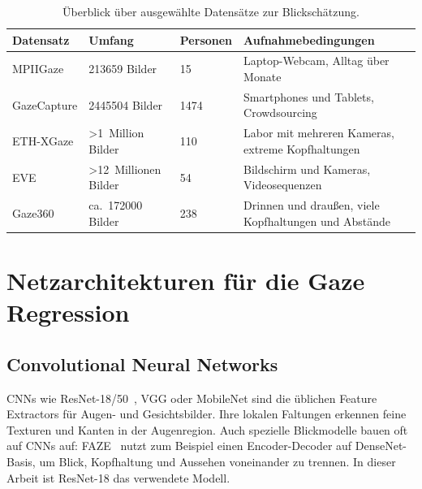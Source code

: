 \begin{table}[htbp]
  \centering
  \small
  \caption{Überblick über ausgewählte Datensätze zur Blickschätzung.}
  \label{tab:datensaetze}
  \begin{tabularx}{\textwidth}{L{2.4cm} L{2.6cm} L{2.2cm} Y}
    \toprule
    \textbf{Datensatz} & \textbf{Umfang} & \textbf{Personen} & \textbf{Aufnahmebedingungen} \\
    \midrule
    MPIIGaze      & \num{213659} Bilder & 15 & Laptop-Webcam, Alltag über Monate \\
    GazeCapture   & \num{2445504} Bilder & \num{1474} & Smartphones und Tablets, Crowdsourcing \\
    ETH-XGaze     & >1~Million Bilder & 110 & Labor mit mehreren Kameras, extreme Kopfhaltungen \\
    EVE           & >12~Millionen Bilder & 54 & Bildschirm und Kameras, Videosequenzen \\
    Gaze360       & ca.\ \num{172000} Bilder & 238 & Drinnen und draußen, viele Kopfhaltungen und Abstände \\
    \bottomrule
  \end{tabularx}
\end{table}

\section{Netzarchitekturen für die Gaze Regression}
\label{sec:architekturen}
\subsection{Convolutional Neural Networks}
\label{subsec:cnn}
CNNs wie ResNet-18/50~\cite{he2016resnet}, VGG oder MobileNet sind die
üblichen Feature Extractors für Augen- und Gesichtsbilder. Ihre lokalen
Faltungen erkennen feine Texturen und Kanten in der Augenregion. Auch
spezielle Blickmodelle bauen oft auf CNNs auf: FAZE~\cite{park2019faze} nutzt
zum Beispiel einen Encoder-Decoder auf DenseNet-Basis, um Blick, Kopfhaltung
und Aussehen voneinander zu trennen. In dieser Arbeit ist ResNet-18 das
verwendete Modell.

